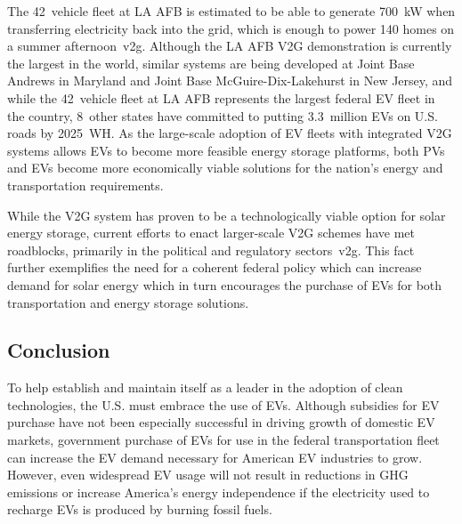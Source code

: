 The 42~vehicle fleet at LA AFB is estimated to be able to generate 700~kW when transferring electricity back into the grid, which is enough to power 140 homes on a summer afternoon~\cite{eric}{v2g}. Although the LA AFB V2G demonstration is currently the largest in the world, similar systems are being developed at Joint Base Andrews in Maryland and Joint Base McGuire-Dix-Lakehurst in New Jersey, and while the 42~vehicle fleet at LA AFB represents the largest federal EV fleet in the country, 8~other states have committed to putting 3.3~million EVs on U.S. roads by 2025~\cite{eric}{WH}. As the large-scale adoption of EV fleets with integrated V2G systems allows EVs to become more feasible energy storage platforms, both PVs and EVs become more economically viable solutions for the nation's energy and transportation requirements.


While the V2G system has proven to be a technologically viable option for solar energy storage, current efforts to enact larger-scale V2G schemes have met roadblocks, primarily in the political and regulatory sectors~\cite{eric}{v2g}. This fact further exemplifies the need for a coherent federal policy which can increase demand for solar energy which in turn encourages the purchase of EVs for both transportation and energy storage solutions.




\subsection{Conclusion}

To help establish and maintain itself as a leader in the adoption of clean technologies, the U.S. must embrace the use of EVs. Although subsidies for EV purchase have not been especially successful in driving growth of domestic EV markets, government purchase of EVs for use in the federal transportation fleet can increase the EV demand necessary for American EV industries to grow. However, even widespread EV usage will not result in reductions in GHG emissions or increase America's energy independence if the electricity used to recharge EVs is produced by burning fossil fuels. 

